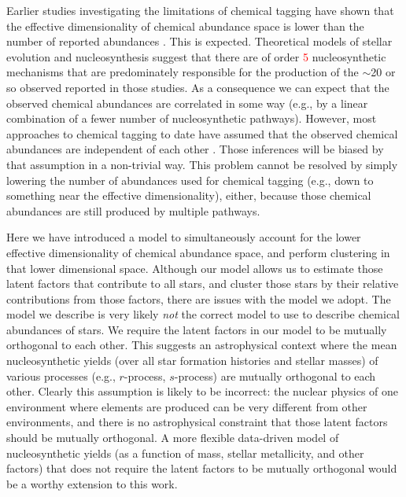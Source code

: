 \documentclass[twocolumn]{aastex62}
\newcommand{\todo}[1]{\textcolor{red}{#1}}
\begin{document}
Earlier studies investigating the limitations of chemical tagging have shown
that the effective dimensionality of chemical abundance space is lower than
the number of reported abundances \citep[e.g.,][]{Ting:2012,Price-Jones:2018}. 
This is expected. Theoretical models of stellar evolution and nucleosynthesis 
suggest that there are of order \todo{5} nucleosynthetic mechanisms that are
predominately responsible for the production of the $\sim$20 or so observed 
reported in those studies. As a consequence we can expect that the observed
chemical abundances are correlated in some way (e.g., by a linear combination
of a fewer number of nucleosynthetic pathways).  However, most approaches to
chemical tagging to date have assumed that the observed chemical abundances
are independent of each other \todo{\citep[e.g.,][]{who}}. Those inferences
will be biased by that assumption in a non-trivial way. This problem cannot be
resolved by simply lowering the number of abundances used for chemical tagging (e.g.,
down to something near the effective dimensionality), either, because those
chemical abundances are still produced by multiple pathways.

Here we have introduced a model to simultaneously account for the lower
effective dimensionality of chemical abundance space, and perform clustering
in that lower dimensional space. Although our model allows us to estimate
those latent factors that contribute to all stars, and cluster those stars by
their relative contributions from those factors, there are issues with the
model we adopt. The model we describe is very likely \emph{not} the correct
model to use to describe chemical abundances of stars. We require the latent
factors in our model to be mutually orthogonal to each other. This suggests
an astrophysical context where the mean nucleosynthetic yields (over all star
formation histories and stellar masses) of various
processes (e.g., $r$-process, $s$-process) are mutually orthogonal to each
other. Clearly this assumption is likely to be incorrect: the nuclear physics
of one environment where elements are produced  can be very different from
other environments, and there is no astrophysical constraint that those
latent factors should be mutually orthogonal.
A more flexible data-driven model of nucleosynthetic yields (as a function of mass,
stellar metallicity, and other factors) that does not require the latent
factors to be mutually orthogonal would be a worthy extension to this work.
\end{document}
